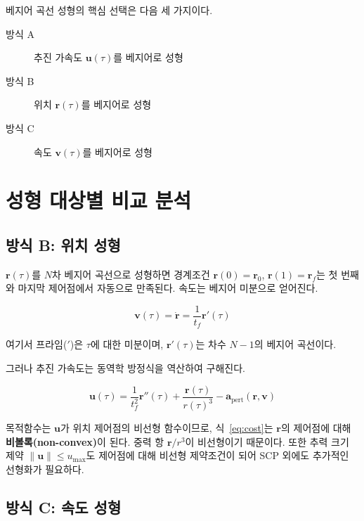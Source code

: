 \documentclass[11pt]{article}
\begin{document}
베지어 곡선 성형의 핵심 선택은 다음 세 가지이다.

\begin{description}
  \item[방식 A] 추진 가속도 $\mathbf{u}(\tau)$를 베지어로 성형
  \item[방식 B] 위치 $\mathbf{r}(\tau)$를 베지어로 성형
  \item[방식 C] 속도 $\mathbf{v}(\tau)$를 베지어로 성형
\end{description}

\section{성형 대상별 비교 분석}

\subsection{방식 B: 위치 성형}

$\mathbf{r}(\tau)$를 $N$차 베지어 곡선으로 성형하면 경계조건
$\mathbf{r}(0) = \mathbf{r}_0$, $\mathbf{r}(1) = \mathbf{r}_f$는 첫 번째와 마지막 제어점에서
자동으로 만족된다.
속도는 베지어 미분으로 얻어진다.

\begin{equation}
  \mathbf{v}(\tau) = \dot{\mathbf{r}} = \frac{1}{t_f}\mathbf{r}'(\tau)
\end{equation}

여기서 프라임($'$)은 $\tau$에 대한 미분이며, $\mathbf{r}'(\tau)$는 차수 $N-1$의 베지어 곡선이다.

그러나 추진 가속도는 동역학 방정식을 역산하여 구해진다.

\begin{equation}
  \mathbf{u}(\tau) = \frac{1}{t_f^2}\mathbf{r}''(\tau) + \frac{\mathbf{r}(\tau)}{r(\tau)^3} - \mathbf{a}_\mathrm{pert}(\mathbf{r}, \mathbf{v})
  \label{eq:u_from_r}
\end{equation}

목적함수는 $\mathbf{u}$가 위치 제어점의 비선형 함수이므로, 식~\eqref{eq:cost}는
$\mathbf{r}$의 제어점에 대해 \textbf{비볼록(non-convex)}이 된다.
중력 항 $\mathbf{r}/r^3$이 비선형이기 때문이다.
또한 추력 크기 제약 $\|\mathbf{u}\| \leq u_\mathrm{max}$도 제어점에 대해
비선형 제약조건이 되어 SCP 외에도 추가적인 선형화가 필요하다.

\subsection{방식 C: 속도 성형}
\end{document}
